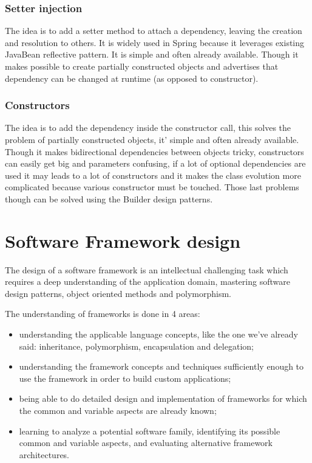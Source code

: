 \subsubsection{Setter injection}
The idea is to add a setter method to attach a dependency, leaving the creation and resolution to others.
It is widely used in Spring because it leverages existing JavaBean reflective pattern.
It is simple and often already available.
Though it makes possible to create partially constructed objects and advertises that dependency can be changed at runtime (as opposed to constructor).

\subsubsection{Constructors}
The idea is to add the dependency inside the constructor call, this solves the problem of partially constructed objects, it' simple and often already available.
Though it makes bidirectional dependencies between objects tricky, constructors can easily get big and parameters confusing, if a lot of optional dependencies are used it may leads to a lot of constructors and it makes the class evolution more complicated because various constructor must be touched.
Those last problems though can be solved using the Builder design patterns.

\section{Software Framework design}
The design of a software framework is an intellectual challenging task which requires a deep understanding of the application domain, mastering software design patterns, object oriented methods and polymorphism.

The understanding of frameworks is done in 4 areas:
\begin{itemize}
    \item understanding the applicable language concepts, like the one we've already said: inheritance, polymorphism, encapsulation and delegation;
    \item understanding the framework concepts and techniques sufficiently enough to use the framework in order to build custom applications;
    \item being able to do detailed design and implementation of frameworks for which the common and variable aspects are already known;
    \item learning to analyze a potential software family, identifying its possible common and variable aspects, and evaluating alternative framework architectures.
\end{itemize}

